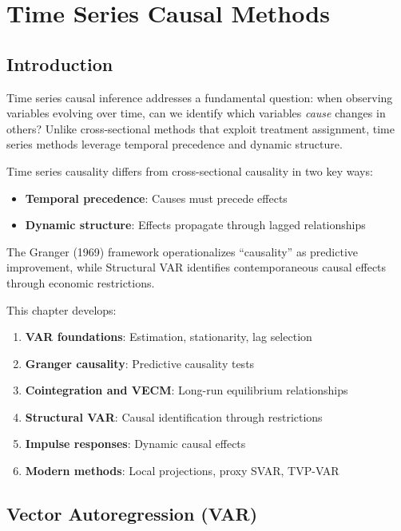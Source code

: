 \chapter{Time Series Causal Methods}
\label{ch:timeseries}

\section{Introduction}

Time series causal inference addresses a fundamental question: when observing variables evolving over time, can we identify which variables \textit{cause} changes in others? Unlike cross-sectional methods that exploit treatment assignment, time series methods leverage temporal precedence and dynamic structure.

\begin{insight}
Time series causality differs from cross-sectional causality in two key ways:
\begin{itemize}
    \item \textbf{Temporal precedence}: Causes must precede effects
    \item \textbf{Dynamic structure}: Effects propagate through lagged relationships
\end{itemize}
The Granger (1969) framework operationalizes ``causality'' as predictive improvement, while Structural VAR identifies contemporaneous causal effects through economic restrictions.
\end{insight}

This chapter develops:
\begin{enumerate}
    \item \textbf{VAR foundations}: Estimation, stationarity, lag selection
    \item \textbf{Granger causality}: Predictive causality tests
    \item \textbf{Cointegration and VECM}: Long-run equilibrium relationships
    \item \textbf{Structural VAR}: Causal identification through restrictions
    \item \textbf{Impulse responses}: Dynamic causal effects
    \item \textbf{Modern methods}: Local projections, proxy SVAR, TVP-VAR
\end{enumerate}


\section{Vector Autoregression (VAR)}

